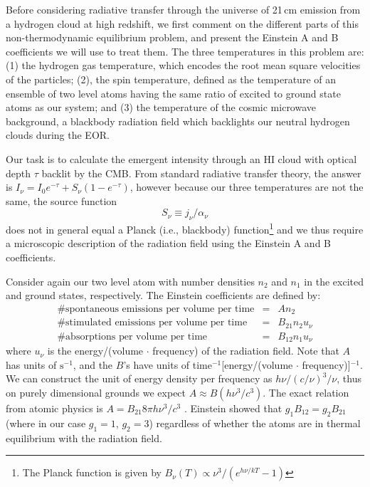 {Before considering radiative transfer through the universe of 21\,cm emission from a hydrogen cloud at high redshift, we first comment on the different parts of this non-thermodynamic equilibrium problem, and present the Einstein A and B coefficients we will use to treat them. The three temperatures in this problem are: (1) the hydrogen gas temperature, which encodes the root mean square velocities of the particles; (2), the spin temperature, defined as the temperature of an ensemble of two level atoms having the same ratio of excited to ground state atoms as our system; and (3) the temperature of the cosmic microwave background, a blackbody radiation field which backlights our neutral hydrogen clouds during the EOR. 

Our task is to calculate the emergent intensity through an HI cloud with optical depth $\tau$ backlit by the CMB. From standard radiative transfer theory, the answer is $I_\nu=I_0e^{-\tau}+S_\nu(1-e^{-\tau})$, however because our three temperatures are not the same, the source function 
\begin{equation}
S_\nu\equiv j_\nu/\alpha_\nu	
\end{equation}
does not in general equal a Planck (i.e., blackbody) function\footnote{The Planck function is given by $B_\nu(T)\propto\nu^3/(e^{h\nu/kT}-1)$} and we thus require a microscopic description of the radiation field using the Einstein A and B coefficients.

Consider again our two level atom with number densities $n_2$ and $n_1$ in the excited and ground states, respectively. The Einstein coefficients are defined by:
\begin{eqnarray}
\text{\# spontaneous emissions per volume per time}&=&An_2 \nonumber\\
\text{\# stimulated emissions per volume per time}&=&B_{21}n_2u_\nu \nonumber\\
\text{\# absorptions per volume per time}&=&B_{12}n_1u_\nu 
\end{eqnarray}
where $u_\nu$ is the energy/(volume $\cdot$ frequency) of the radiation field. Note that $A$ has units of $\text{s}^{-1}$, and the $B$'s have units of time$^{-1}$[energy/(volume $\cdot$ frequency)]$^{-1}$. We can construct the unit of energy density per frequency as $h\nu/(c/\nu)^3/\nu$, thus on purely dimensional grounds we expect $A\approx B (h\nu^3/c^3)$. The exact relation from atomic physics is $A=B_{21}8\pi h \nu^3/c^3$ \citep{choudhuri2010astrophysics} . Einstein showed that $g_1B_{12}=g_2B_{21}$ (where in our case $g_1=1$, $g_2=3$) regardless of whether the atoms are in thermal equilibrium with the radiation field.

}
